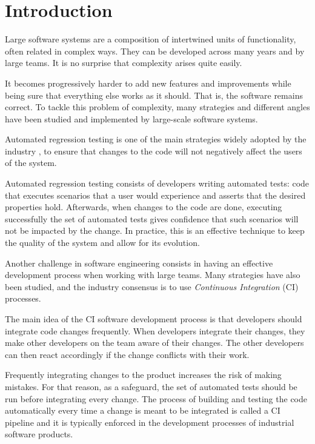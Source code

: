 \chapter{Introduction}\label{s:introduction}

Large software systems are a composition of intertwined units of functionality,
often related in complex ways. They can be developed across many years and by 
large teams. It is no surprise that complexity arises quite easily. 

It becomes progressively harder to add new features and improvements while being 
sure that everything else works as it should. That is, the software remains
correct. To tackle this problem of complexity, many strategies and different 
angles have been studied and implemented by large-scale software systems. 

Automated regression testing \cite{baresiregtest} is one of the main strategies widely adopted by the industry \cite{10.1007/s10606-009-9098-7},
to ensure that changes to the code will not negatively affect the users of the system. 

Automated regression testing consists of developers writing automated tests: code that executes scenarios that a user would experience
and asserts that the desired properties hold. Afterwards, when changes to the code are done,
executing successfully the set of automated tests gives confidence that such scenarios will
not be impacted by the change. In practice, this is an effective technique to keep the quality of the system and
allow for its evolution. \cite{10.1007/s10606-009-9098-7}\cite{baresiregtest}

Another challenge in software engineering consists in having an effective development process when
working with large teams. Many strategies have also been studied, and the industry 
consensus is to use \emph{Continuous Integration} (CI) processes.

The main idea of the CI software development process is that developers should
integrate code changes frequently. When developers integrate their changes,
they make other developers on the team aware of their changes. The other developers
can then react accordingly if the change conflicts with their work.

Frequently integrating changes to the product increases the risk of making mistakes.
For that reason, as a safeguard, the set of automated tests should be run before 
integrating every change. The process of building and testing the code automatically
every time a change is meant to be integrated is called a CI pipeline and it is typically
enforced in the development processes of industrial software products.

